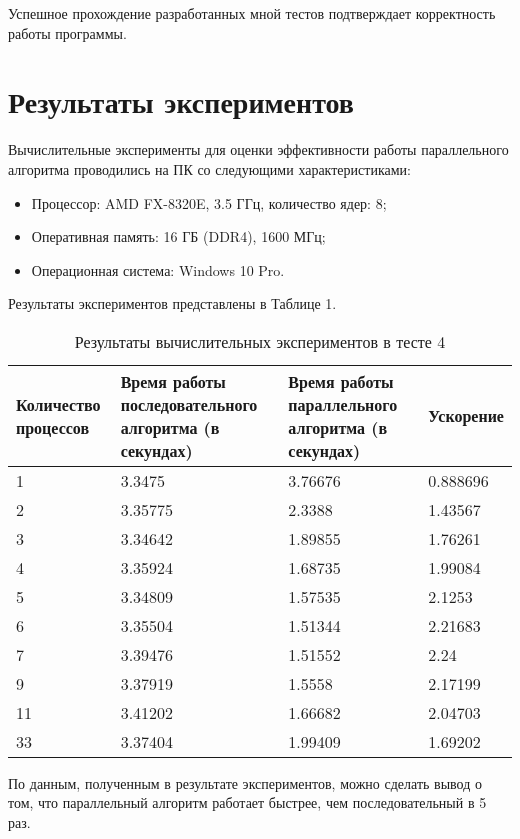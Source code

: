 \documentclass{report}
\begin{document}
\par Успешное прохождение разработанных мной тестов подтверждает корректность работы программы.
\newpage

\section*{Результаты экспериментов}
Вычислительные эксперименты для оценки эффективности работы параллельного алгоритма проводились на ПК со следующими характеристиками:
\begin{itemize}
\item Процессор: AMD FX-8320E, 3.5 ГГц, количество ядер: 8;
\item Оперативная память: 16 ГБ (DDR4), 1600  МГц;
\item Операционная система: Windows 10 Pro.
\end{itemize}

\par Результаты экспериментов представлены в Таблице 1.

\begin{table}[!h]
\caption{Результаты вычислительных экспериментов в тесте 4}
\centering
\begin{tabular}{| p{2cm} | p{3cm} | p{4cm} | p{2cm} |}
\hline
Количество процессов & Время работы последовательного алгоритма (в секундах) & Время работы параллельного алгоритма (в секундах) & Ускорение  \\[5pt]
\hline
1        & 3.3475        & 3.76676     & 0.888696       \\
2        & 3.35775        & 2.3388     & 1.43567       \\
3        & 3.34642        & 1.89855     & 1.76261       \\
4        & 3.35924        & 1.68735     & 1.99084       \\
5        & 3.34809        & 1.57535     & 2.1253       \\
6        & 3.35504        & 1.51344     & 2.21683       \\
7        & 3.39476        & 1.51552     & 2.24       \\
9        & 3.37919        & 1.5558     & 2.17199	    \\
11        & 3.41202        & 1.66682     & 2.04703	  \\
33        & 3.37404        & 1.99409     & 1.69202	  \\
\hline
\end{tabular}
\end{table}
По данным, полученным в результате экспериментов, можно сделать вывод о том,
что параллельный алгоритм работает быстрее, чем последовательный в 5 раз.
\end{document}
